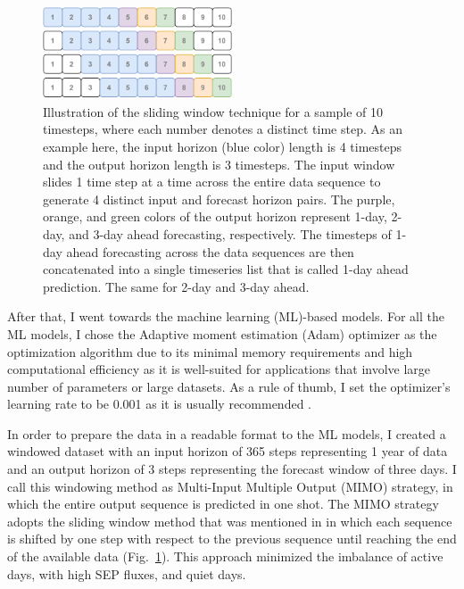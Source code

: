 \begin{figure}[htp]
	\centering
    \includegraphics[width=0.5\textwidth]{chapter4/figs/sliding_window_lstm.pdf}
    \caption{Illustration of the sliding window technique for a sample of 10 timesteps, where each number denotes a distinct time step. As an example here, the input horizon (blue color) length is 4 timesteps and the output horizon length is 3 timesteps. The input window slides 1 time step at a time across the entire data sequence to generate 4 distinct input and forecast horizon pairs. The purple, orange, and green colors of the output horizon represent 1-day, 2-day, and 3-day ahead forecasting, respectively. The timesteps of 1-day ahead forecasting across the data sequences are then concatenated into a single timeseries list that is called 1-day ahead prediction. The same for 2-day and 3-day ahead.}
\label{fig_slide_window}
\end{figure}

After that, I went towards the machine learning (ML)-based models. For all the ML models, I chose the Adaptive moment estimation (Adam) optimizer \citep{kingma_2015} as the optimization algorithm due to its minimal memory requirements and high computational efficiency as it is well-suited for applications that involve large number of parameters or large datasets. As a rule of thumb, I set the optimizer’s learning rate to be 0.001 as it is usually recommended \citep{zhang_2022}.

In order to prepare the data in a readable format to the ML models, I created a windowed dataset with an input horizon of 365 steps representing 1 year of data and an output horizon of 3 steps representing the forecast window of three days. I call this windowing method as Multi-Input Multiple Output (MIMO) strategy, in which the entire output sequence is predicted in one shot. The MIMO strategy adopts the sliding window method that was mentioned in \citet{benson_2020} in which each sequence is shifted by one step with respect to the previous sequence until reaching the end of the available data (Fig.~\ref{fig_slide_window}).
This approach minimized the imbalance of active days, with high SEP fluxes, and quiet days.

